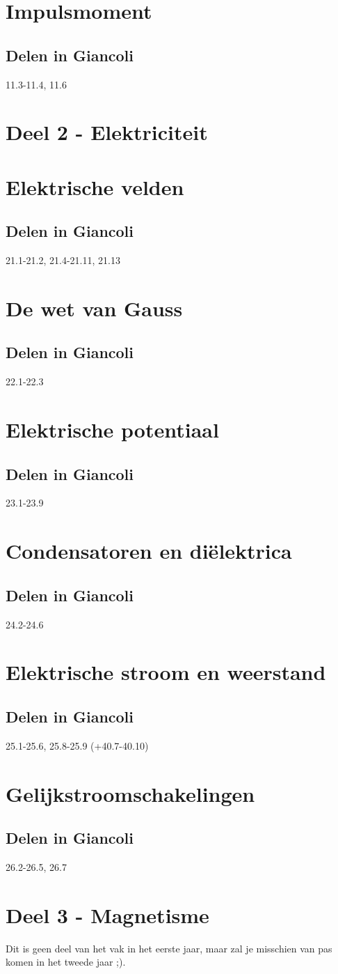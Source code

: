 \documentclass[12pt,a4paper]{article}
\begin{document}
	\section{Impulsmoment}
	\subsection{Delen in Giancoli}
	11.3-11.4, 11.6
	\newpage
	
	
	\section{Deel 2 - Elektriciteit}
	\section{Elektrische velden}
	\subsection{Delen in Giancoli}
	21.1-21.2, 21.4-21.11, 21.13 
	\section{De wet van Gauss}
	\subsection{Delen in Giancoli}
	22.1-22.3
	\section{Elektrische potentiaal}
	\subsection{Delen in Giancoli}
	23.1-23.9
	\section{Condensatoren en diëlektrica}
	\subsection{Delen in Giancoli}
	24.2-24.6
	\section{Elektrische stroom en weerstand}
	\subsection{Delen in Giancoli}
	25.1-25.6, 25.8-25.9 (+40.7-40.10)
	\section{Gelijkstroomschakelingen}
	\subsection{Delen in Giancoli}
	26.2-26.5, 26.7
	\newpage
	\section{Deel 3 - Magnetisme}
	Dit is geen deel van het vak in het eerste jaar, maar zal je misschien van pas komen in het tweede jaar ;).
\end{document}
